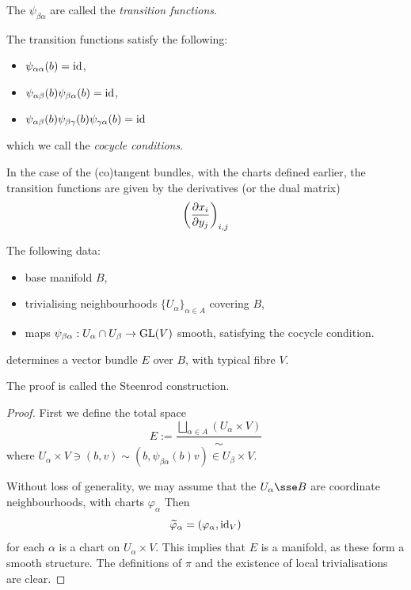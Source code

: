 \documentclass{article}
\begin{document}
\begin{definition}
     The \(\psi_{\beta\alpha}\) are called the \emph{transition functions}.
\end{definition}

The transition functions satisfy the following:
\begin{itemize}
    \item \(\psi_{\alpha\alpha}(b) = \operatorname{id}\),
    \item \(\psi_{\alpha\beta}(b)\psi_{\beta\alpha}(b) = \operatorname{id}\),
    \item \(\psi_{\alpha\beta}(b)\psi_{\beta\gamma}(b)\psi_{\gamma\alpha}(b) = \operatorname{id}\)
\end{itemize}
which we call the \emph{cocycle conditions}.

\begin{example}
    In the case of the (co)tangent bundles, with the charts defined earlier, the transition functions are given by the derivatives (or the dual matrix)
    \[\left(
        \pdv{x_i}{y_j}
    \right)_{i, j}\]
\end{example}

\begin{proposition}
    The following data:
    \begin{itemize}
        \item base manifold \(B\),
        \item trivialising neighbourhoods \(\{U_\alpha\}_{\alpha \in A}\) covering \(B\),
        \item maps \(\psi_{\beta\alpha} : U_\alpha \cap U_\beta \to \operatorname{GL}(V)\) smooth, satisfying the cocycle condition.
    \end{itemize}
    determines a vector bundle \(E\) over \(B\), with typical fibre \(V\).
\end{proposition}

The proof is called the Steenrod construction.

\begin{proof}
    First we define the total space
    \[E := \frac{\bigsqcup_{\alpha \in A}(U_\alpha \times V)}{\sim}\]
    where \(U_\alpha \times V \ni (b, v) \sim (b, \psi_{\beta\alpha}(b)v) \in U_\beta \times V\).

    Without loss of generality, we may assume that the \(U_\alpha \sse B\) are coordinate neighbourhoods, with charts \(\varphi_\alpha\) Then
    \[\widetilde\varphi_\alpha = (\varphi_\alpha, \operatorname{id}_V)\]
    for each \(\alpha\) is a chart on \(U_\alpha \times V\). This implies that \(E\) is a manifold, as these form a smooth structure. The definitions of \(\pi\) and the existence of local trivialisations are clear.
\end{proof}
\end{document}
